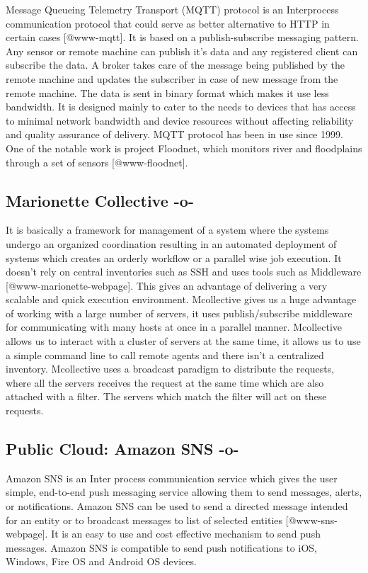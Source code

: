 Message Queueing Telemetry Transport (MQTT) protocol is an
Interprocess communication protocol that could serve as better
alternative to HTTP in certain cases [@www-mqtt]. It is based on a
publish-subscribe messaging pattern. Any sensor or remote machine can
publish it's data and any registered client can subscribe the data. A
broker takes care of the message being published by the remote machine
and updates the subscriber in case of new message from the remote
machine. The data is sent in binary format which makes it use less
bandwidth. It is designed mainly to cater to the needs to devices that
has access to minimal network bandwidth and device resources without
affecting reliability and quality assurance of delivery. MQTT protocol
has been in use since 1999. One of the notable work is project
Floodnet, which monitors river and floodplains through a set of
sensors [@www-floodnet].



\subsection{Marionette Collective -o-}

It is basically a framework for management of a system where the
systems undergo an organized coordination resulting in an automated
deployment of systems which creates an orderly workflow or a parallel
wise job execution. It doesn't rely on central inventories such as SSH
and uses tools such as Middleware [@www-marionette-webpage]. This
gives an advantage of delivering a very scalable and quick execution
environment.  Mcollective gives us a huge advantage of working with a
large number of servers, it uses publish/subscribe middleware for
communicating with many hosts at once in a parallel
manner. Mcollective allows us to interact with a cluster of servers at
the same time, it allows us to use a simple command line to call
remote agents and there isn't a centralized inventory. Mcollective
uses a broadcast paradigm to distribute the requests, where all the
servers receives the request at the same time which are also attached
with a filter. The servers which match the filter will act on these
requests.


     
\subsection{Public Cloud: Amazon SNS -o-}

Amazon SNS is an Inter process communication service which gives the
user simple, end-to-end push messaging service allowing them to send
messages, alerts, or notifications. Amazon SNS can be used to send a
directed message intended for an entity or to broadcast messages to
list of selected entities [@www-sns-webpage].  It is an easy to
use and cost effective mechanism to send push messages. Amazon SNS is
compatible to send push notifications to iOS, Windows, Fire OS and
Android OS devices.

